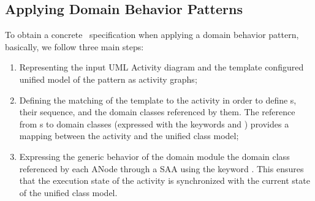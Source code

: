 \subsection{Applying Domain Behavior Patterns}
To obtain a concrete \agl~specification when applying a domain behavior pattern, basically, we follow three main steps:
\begin{enumerate}
	\item Representing the input UML Activity diagram and the template configured unified model of the pattern as activity graphs; 
	\item %
	Defining the matching of the template to the activity in order to define s, their sequence, and the domain classes referenced by them. The reference from s to domain classes (expressed with the keywords  and ) provides a mapping between the activity and the unified class model;
	\item %
	Expressing the generic behavior of the domain module \wrt the domain class referenced by each ANode through a SAA using the keyword . This ensures that the execution state of the activity is synchronized with the current state of the unified class model.
\end{enumerate} 

